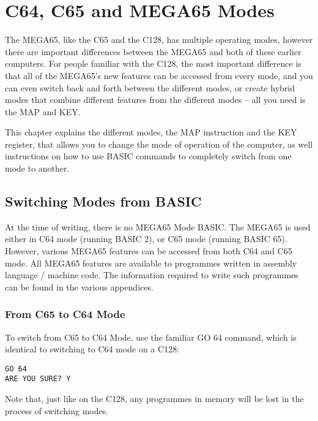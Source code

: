 \chapter {C64, C65 and MEGA65 Modes}
\label{cha:modes}

The MEGA65, like the C65 and the C128, has multiple operating modes,
however there are important differences between the MEGA65 and both
of these earlier computers.  For people familiar with the C128,
the most important difference is that all of the MEGA65's new features
can be accessed from every mode, and you can even switch back and forth
between the different modes, or create hybrid modes that combine different
features from the different modes -- all you need is the MAP and KEY.

This chapter explains the different modes, the MAP instruction and
the KEY register, that allows you to change the mode of operation of the computer,
as well instructions on how to use BASIC commands to completely switch
from one mode to another.

\section{Switching Modes from BASIC}

At the time of writing, there is no MEGA65 Mode BASIC. The MEGA65 is used either
in C64 mode (running BASIC 2), or C65 mode (running BASIC 65).  However, various MEGA65
features can be accessed from both C64 and C65 mode.  All MEGA65 features are available
to programmes written in assembly language / machine code.  The information required
to write such programmes can be found in the various appendices.

\subsection{From C65 to C64 Mode}

To switch from C65 to C64 Mode, use the familiar GO 64 command, which is identical to switching to C64
mode on a C128:

\begin{tcolorbox}[colback=black,coltext=white]
\verbatimfont{\codefont}
\begin{verbatim}
GO 64
ARE YOU SURE? Y
\end{verbatim}
\end{tcolorbox}

Note that, just like on the C128, any programmes in memory will be lost in the process of switching modes.

